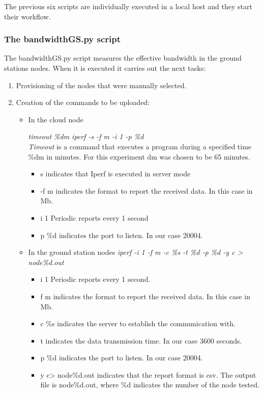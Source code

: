 The previous six scripts are individually executed in a local host and they start their workflow.

\subsubsection{The bandwidthGS.py script}

The bandwidthGS.py  script measures the effective bandwidth in the ground
stations nodes. When it is executed it carries out the next tasks:
\begin{enumerate}
\item Provisioning of the nodes that were manually selected.
\item Creation of the commands to be uploaded:
\begin{itemize}
\item In the cloud node

\emph{timeout \%dm iperf -s -f m -i 1 -p \%d} \\
\emph{Timeout} is a command that executes a program during a specified time \%dm in
minutes. For this experiment dm was chosen to be 65 minutes.
\begin{itemize}
\item s indicates that Iperf is executed in server mode
\item -f m indicates the format to report the received data. In this case in Mb.  
\item i 1 Periodic reports every 1 second
\item p \%d indicates the port to listen. In our case 20004.
\end{itemize}

\item In the ground station nodes
\emph{iperf  -i 1 -f m -c \%s -t \%d -p \%d  -y c > node\%d.out}\\
\begin{itemize}
\item i 1 Periodic reports every 1 second.
\item f m indicates the format to report the received data. In this case in Mb.
\item c \%s indicates the server to establish the communication with.
\item t indicates the data transmission time. In our case 3600 seconds.
\item p \%d indicates the port to listen. In our case 20004.
\item y c> node\%d.out indicates that the report format is csv. The output file
  is node\%d.out, where \%d indicates the number of the node tested.
\end{itemize}
\end{itemize}


\end{enumerate}
